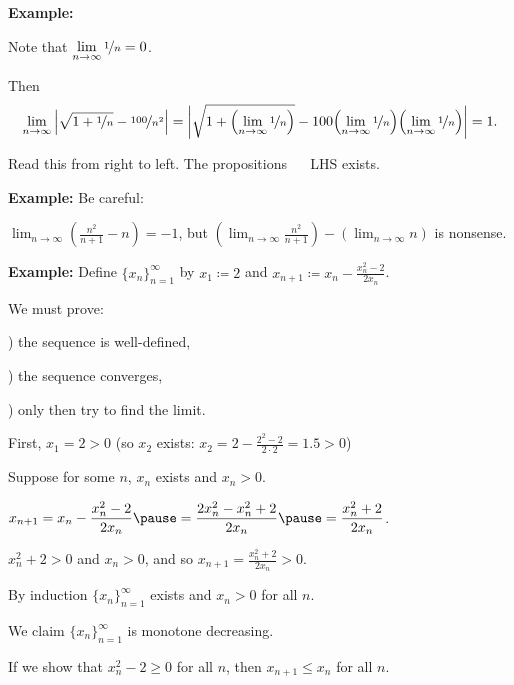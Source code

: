\documentclass[10pt,aspectratio=149]{beamer}
\begin{document}
\begin{frame}

\textbf{Example:}

Note that
$\lim\limits_{n\to\infty} \nicefrac{1}{n} = 0$.

\pause
Then
\begin{equation*}
\lim_{n\to \infty}
\left\lvert {\sqrt{1 + \nicefrac{1}{n}} - \nicefrac{100}{n^2}} \right\rvert =  
\left\lvert {\sqrt{1 + \Bigl(\lim_{n\to\infty} \nicefrac{1}{n}\Bigr)} -
100 \Bigl(\lim_{n\to\infty} \nicefrac{1}{n}\Bigr)\Bigl(\lim_{n\to\infty} \nicefrac{1}{n}\Bigr)} \right\rvert = 1.
\end{equation*}

\pause
Read this from right to left.  The propositions ~\thus~ LHS exists.

\pause
\medskip

\textbf{Example:}
Be careful:

\medskip

$\displaystyle
\lim_{n\to \infty} \left( \frac{n^2}{n+1} - n \right)
= -1$,
\quad
\pause
but
\quad
$\displaystyle \left(\lim_{n\to\infty} \frac{n^2}{n+1}\right) -
\left(\lim_{n\to\infty} n\right)$ is nonsense.

\end{frame}


\begin{frame}
\textbf{Example:}
Define $\{ x_n \}_{n=1}^\infty$ by $x_1 \coloneqq 2$ and
$\displaystyle x_{n+1} \coloneqq x_n - \frac{x_n^2-2}{2x_n}$.

\medskip
\pause

We must prove:

) the sequence is well-defined,

) the sequence converges,

) only then try to find the limit.

\medskip
\pause

First, $x_1 = 2 > 0$ (so $x_2$ exists: $x_2 = 2-\frac{2^2-2}{2\cdot 2} = 1.5
> 0$)

\medskip
\pause

Suppose for some $n$, $x_n$ exists and $x_n > 0$.

\medskip
\pause

$\displaystyle
x_{n+1} = x_n - \frac{x_n^2-2}{2x_n}
\pause
=
\frac{2x_n^2 - x_n^2+2}{2x_n}
\pause
=
\frac{x_n^2+2}{2x_n}$.

\medskip
\pause

$x_n^2+2 > 0$ and $x_n > 0$,
\pause
and so
$x_{n+1} = \frac{x_n^2+2}{2x_n} > 0$.

\medskip
\pause

By induction $\{ x_n \}_{n=1}^\infty$ exists and $x_n > 0$ for all $n$.

\medskip
\pause

We claim $\{ x_n \}_{n=1}^\infty$ is monotone decreasing.

\medskip
\pause

If we show that $x_n^2-2 \geq 0$ for all $n$, then $x_{n+1} \leq x_n$ for all $n$.

\end{frame}
\end{document}
